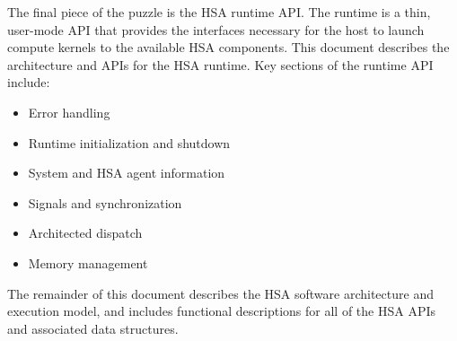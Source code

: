 \documentclass[final,oneside]{book}
\begin{document}
The final piece of the puzzle is the HSA runtime API.  The runtime is a thin,
user-mode API that provides the interfaces necessary for the host to launch
compute kernels to the available HSA components. This document describes the
architecture and APIs for the HSA runtime. Key sections of the runtime API
include:
\begin{itemize}[itemsep=0pt,topsep=0pt,partopsep=0pt]
\item Error handling
\item Runtime initialization and shutdown
\item System and HSA agent information
\item Signals and synchronization
\item Architected dispatch
\item Memory management
\end{itemize}

The remainder of this document describes the HSA software architecture and
execution model, and includes functional descriptions for all of the HSA APIs
and associated data structures.
\end{document}

